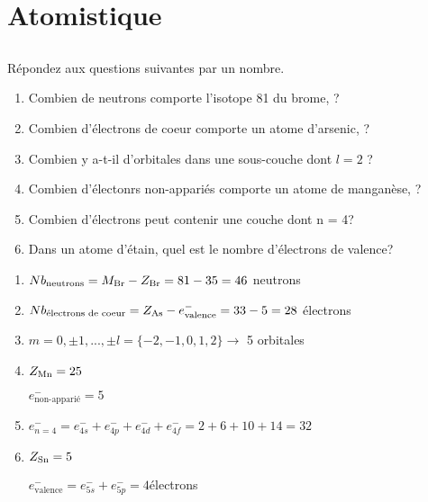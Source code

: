 \section{Atomistique}

\subsection{}
Répondez aux questions suivantes par un nombre.
\begin{enumerate}[label = (\alph*)]
	\item Combien de neutrons comporte l'isotope 81 du brome, ?
	\item Combien d'électrons de coeur comporte un atome d'arsenic, ?
	\item Combien y a-t-il d'orbitales dans une sous-couche dont $l=2$ ?
	\item Combien d'électonrs non-appariés comporte un atome de manganèse, ?
	\item Combien d'électrons peut contenir une couche dont n = 4?
	\item Dans un atome d'étain,  quel est le nombre d'électrons de valence?
\end{enumerate}

\begin{solution}
	\begin{enumerate}[label = (\alph*)]
		\item $Nb_{\text{neutrons}} = M_{\ce{Br}} - Z_{\ce{Br}} = 81 - 35 = 46$ neutrons
		\item $Nb_{\text{électrons de coeur}} = Z_{\ce{As}}  - e^-_{\text{valence}}= 33 - 5 = 28$ électrons
		\item $m = 0, \pm1, ..., \pm l = \{-2,-1,0,1,2\} \rightarrow$ 5 orbitales
		\item $Z_{\ce{Mn}} = 25$\\
			
			$e^-_{\text{non-apparié}} = 5$
			\item $e^-_{n = 4} = e^-_{4s}+e^-_{4p}+e^-_{4d}+e^-_{4f} = 2 +6+10+14 = 32$
			\item $Z_{\ce{Sn}} = 5$
			
			
			$e^-_{\text{valence}} = e^-_{5s}+e^-_{5p}=4$électrons
 	\end{enumerate}
\end{solution}


